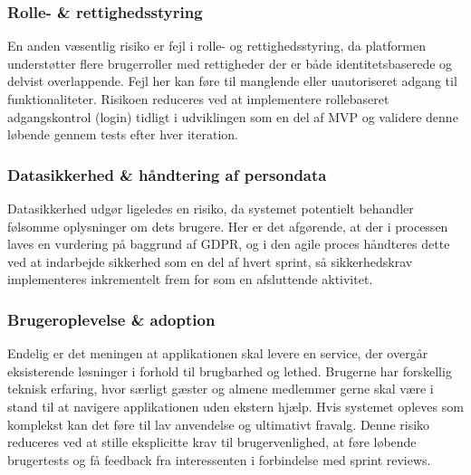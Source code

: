 \subsubsection{Rolle- \& rettighedsstyring}
En anden væsentlig risiko er fejl i rolle- og rettighedsstyring, da platformen understøtter flere brugerroller med rettigheder der er både identitetsbaserede
og delvist overlappende.
Fejl her kan føre til manglende eller uautoriseret adgang til funktionaliteter.
Risikoen reduceres ved at implementere rollebaseret adgangskontrol (login) tidligt i udviklingen som en del af MVP og validere denne løbende gennem tests efter hver iteration.

\subsubsection{Datasikkerhed \& håndtering af persondata}
Datasikkerhed udgør ligeledes en risiko, da systemet potentielt behandler følsomme oplysninger om dets brugere.
Her er det afgørende, at der i processen laves en vurdering på baggrund af GDPR, og i den agile proces håndteres dette ved at indarbejde sikkerhed som en del af hvert sprint, så sikkerhedskrav implementeres inkrementelt frem for som en afsluttende aktivitet.

\subsubsection{Brugeroplevelse \& adoption}
Endelig er det meningen at applikationen skal levere en service, der overgår eksisterende løsninger i forhold til brugbarhed og lethed.
Brugerne har forskellig teknisk erfaring, hvor særligt gæster og almene medlemmer gerne skal være i stand til at navigere applikationen uden ekstern hjælp.
Hvis systemet opleves som komplekst kan det føre til lav anvendelse og ultimativt fravalg.
Denne risiko reduceres ved at stille eksplicitte krav til brugervenlighed, at føre løbende brugertests og få feedback fra interessenten i forbindelse med sprint reviews.
